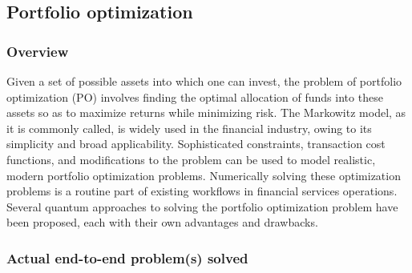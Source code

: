 \begin{refsection}
\localtableofcontents
\printbibliography[heading=secbib,segment=\therefsegment]
\end{refsection}
\newpage

\begin{refsection}
\subsection{Portfolio optimization}\label{appl:PortfolioOptimization}
\subsubsection*{Overview}
Given a set of possible assets into which one can invest, the problem of portfolio optimization (PO) involves finding the optimal allocation of funds into these assets so as to maximize returns while minimizing risk.
The Markowitz model, as it is commonly called, is widely used in the financial industry, owing to its simplicity and broad applicability. Sophisticated constraints, transaction cost functions, and modifications to the problem can be used to model realistic, modern portfolio optimization problems. Numerically solving these optimization problems is a routine part of existing workflows in financial services operations.  Several quantum approaches to solving the portfolio optimization problem have been proposed, each with their own advantages and drawbacks.


\subsubsection*{Actual end-to-end problem(s) solved}


\end{refsection}
